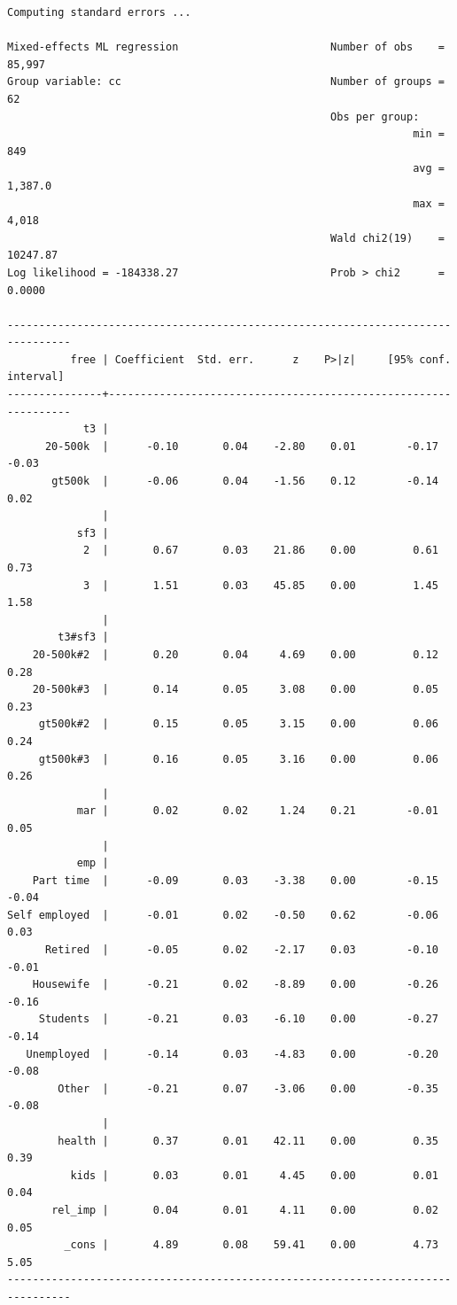 \documentclass[10pt, letterpaper]{article}
\begin{document}
\begin{spacing}{1.4}
\begin{scriptsize}
\begin{spacing}{.19}
\begin{verbatim}
Computing standard errors ...

Mixed-effects ML regression                        Number of obs    =   85,997
Group variable: cc                                 Number of groups =       62
                                                   Obs per group:
                                                                min =      849
                                                                avg =  1,387.0
                                                                max =    4,018
                                                   Wald chi2(19)    = 10247.87
Log likelihood = -184338.27                        Prob > chi2      =   0.0000

--------------------------------------------------------------------------------
          free | Coefficient  Std. err.      z    P>|z|     [95% conf. interval]
---------------+----------------------------------------------------------------
            t3 |
      20-500k  |      -0.10       0.04    -2.80    0.01        -0.17       -0.03
       gt500k  |      -0.06       0.04    -1.56    0.12        -0.14        0.02
               |
           sf3 |
            2  |       0.67       0.03    21.86    0.00         0.61        0.73
            3  |       1.51       0.03    45.85    0.00         1.45        1.58
               |
        t3#sf3 |
    20-500k#2  |       0.20       0.04     4.69    0.00         0.12        0.28
    20-500k#3  |       0.14       0.05     3.08    0.00         0.05        0.23
     gt500k#2  |       0.15       0.05     3.15    0.00         0.06        0.24
     gt500k#3  |       0.16       0.05     3.16    0.00         0.06        0.26
               |
           mar |       0.02       0.02     1.24    0.21        -0.01        0.05
               |
           emp |
    Part time  |      -0.09       0.03    -3.38    0.00        -0.15       -0.04
Self employed  |      -0.01       0.02    -0.50    0.62        -0.06        0.03
      Retired  |      -0.05       0.02    -2.17    0.03        -0.10       -0.01
    Housewife  |      -0.21       0.02    -8.89    0.00        -0.26       -0.16
     Students  |      -0.21       0.03    -6.10    0.00        -0.27       -0.14
   Unemployed  |      -0.14       0.03    -4.83    0.00        -0.20       -0.08
        Other  |      -0.21       0.07    -3.06    0.00        -0.35       -0.08
               |
        health |       0.37       0.01    42.11    0.00         0.35        0.39
          kids |       0.03       0.01     4.45    0.00         0.01        0.04
       rel_imp |       0.04       0.01     4.11    0.00         0.02        0.05
         _cons |       4.89       0.08    59.41    0.00         4.73        5.05
--------------------------------------------------------------------------------


\end{verbatim}
\end{spacing}
\end{scriptsize}
\end{spacing}
\end{document}
